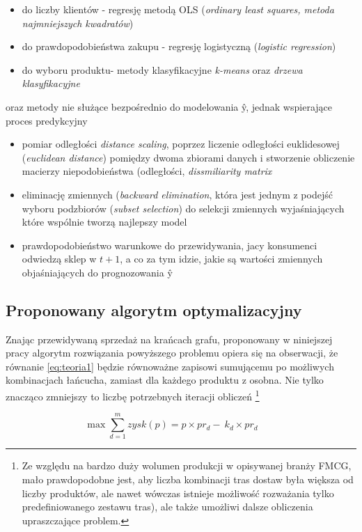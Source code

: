 \documentclass[polish, twoside, 12pt, a4paper]{article}
\theoremstyle{definition}
\theoremstyle{plain}
\theoremstyle{remark}
\begin{document}
	\begin{itemize} 
		\item do liczby klientów - regresję metodą OLS (\textit{ordinary least squares, metoda najmniejszych kwadratów})
		\item do prawdopodobieństwa zakupu - regresję logistyczną (\textit{logistic regression})
		\item do wyboru produktu- metody klasyfikacyjne \textit{k-means} oraz \textit{drzewa klasyfikacyjne}
	\end{itemize}
	oraz metody nie służące bezpośrednio do modelowania \^{y}, jednak wspierające proces predykcyjny
	\begin{itemize} 
		\item pomiar odległości \textit{distance scaling}, poprzez liczenie odległości euklidesowej (\textit{euclidean distance}) pomiędzy dwoma zbiorami danych i stworzenie obliczenie macierzy niepodobieństwa (odległości, \textit{dissmiliarity matrix}
		\item eliminację zmiennych (\textit{backward elimination}, która jest jednym z podejść wyboru podzbiorów (\textit{subset selection}) do selekcji zmiennych wyjaśniających które wspólnie tworzą najlepszy model
		\item prawdopodobieństwo warunkowe do przewidywania, jacy konsumenci odwiedzą sklep w $t+1$, a co za tym idzie, jakie są wartości zmiennych objaśniających do prognozowania  \^{y}
	\end{itemize}	


\newpage

\subsection{Proponowany algorytm optymalizacyjny} 
Znając przewidywaną sprzedaż na krańcach grafu, proponowany w niniejszej pracy algorytm rozwiązania powyższego problemu opiera się na obserwacji, że równanie \ref{eq:teoria1} będzie równoważne zapisowi sumującemu po możliwych kombinacjach łańcucha, zamiast dla każdego produktu z osobna. Nie tylko znacząco zmniejszy to liczbę potrzebnych iteracji obliczeń \footnote{Ze względu na bardzo duży wolumen produkcji w opisywanej branży FMCG, mało prawdopodobne jest, aby liczba kombinacji tras dostaw była większa od liczby produktów, ale nawet wówczas istnieje możliwość rozważania tylko predefiniowanego zestawu tras), ale także umożliwi dalsze obliczenia upraszczające problem.}

\begin{equation}  \label{eq:teoria2}
\max \sum\limits_{d=1}^m  zysk(p) = 
p \times pr_d -  \ k_d \times pr_d \qquad 
\end{equation}
\end{document}
